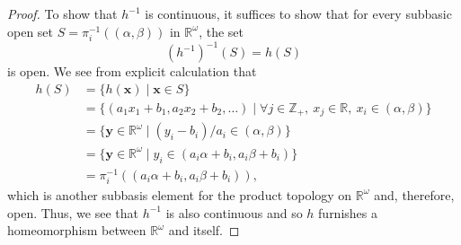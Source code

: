 \documentclass[a4paper,10pt]{article}
\newcommand{\bx}{\mathbf{x}}
\newcommand{\by}{\mathbf{y}}
\newcommand{\inv}{^{-1}}
\newcommand{\ZZ}{\mathbb{Z}}
\newcommand{\RR}{\mathbb{R}}
\begin{document}
\begin{solution}
\begin{proof}
        To show that $h\inv$ is continuous, it suffices to show that for every subbasic open set $S = \pi_i\inv\left((\alpha, \beta)\right)$ in $\RR^\omega$, the set
        \begin{equation*}
            (h\inv)\inv(S) = h(S)
        \end{equation*}
        is open.
        We see from explicit calculation that
        \begin{align*}
            h(S)    &= \{h(\bx) \mid \bx \in S\} \\
                    &= \{(a_1 x_1 + b_1, a_2 x_2 + b_2, \ldots) \mid \forall j \in \ZZ_+,~ x_j \in \RR,~ x_i \in (\alpha, \beta)\} \\
                    &= \{\by \in \RR^\omega \mid  (y_i - b_i) / a_i \in (\alpha, \beta)\} \\
                    &= \{\by \in \RR^\omega \mid y_i \in \left(a_i \alpha + b_i, a_i \beta + b_i\right)\} \\
                    &= \pi_i\inv\left((a_i \alpha + b_i, a_i \beta + b_i)\right),
        \end{align*}
        which is another subbasis element for the product topology on $\RR^\omega$ and, therefore, open.
        Thus, we see that $h\inv$ is also continuous and so $h$ furnishes a homeomorphism between $\RR^\omega$ and itself.
    \end{proof}
\end{solution}
\newpage
\end{document}
